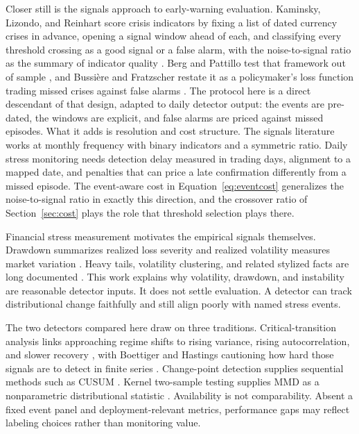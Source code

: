 \documentclass[pdflatex,sn-mathphys-num,iicol]{sn-jnl}
\begin{document}
Closer still is the signals approach to early-warning evaluation. Kaminsky, Lizondo, and Reinhart score crisis indicators by fixing a list of dated currency crises in advance, opening a signal window ahead of each, and classifying every threshold crossing as a good signal or a false alarm, with the noise-to-signal ratio as the summary of indicator quality \cite{kaminsky1998}. Berg and Pattillo test that framework out of sample \cite{berg1999}, and Bussi{\`e}re and Fratzscher restate it as a policymaker's loss function trading missed crises against false alarms \cite{bussiere2006}. The protocol here is a direct descendant of that design, adapted to daily detector output: the events are pre-dated, the windows are explicit, and false alarms are priced against missed episodes. What it adds is resolution and cost structure. The signals literature works at monthly frequency with binary indicators and a symmetric ratio. Daily stress monitoring needs detection delay measured in trading days, alignment to a mapped date, and penalties that can price a late confirmation differently from a missed episode. The event-aware cost in Equation~\eqref{eq:eventcost} generalizes the noise-to-signal ratio in exactly this direction, and the crossover ratio of Section~\ref{sec:cost} plays the role that threshold selection plays there.

Financial stress measurement motivates the empirical signals themselves. Drawdown summarizes realized loss severity \cite{magdon2004} and realized volatility measures market variation \cite{andersen2003}. Heavy tails, volatility clustering, and related stylized facts are long documented \cite{mandelbrot1963,cont2001,engle1982,bollerslev1986}. This work explains why volatility, drawdown, and instability are reasonable detector inputs. It does not settle evaluation. A detector can track distributional change faithfully and still align poorly with named stress events.

The two detectors compared here draw on three traditions. Critical-transition analysis links approaching regime shifts to rising variance, rising autocorrelation, and slower recovery \cite{scheffer2009,dakos2012}, with Boettiger and Hastings cautioning how hard those signals are to detect in finite series \cite{boettiger2012}. Change-point detection supplies sequential methods such as CUSUM \cite{page1954}. Kernel two-sample testing supplies MMD as a nonparametric distributional statistic \cite{gretton2012}. Availability is not comparability. Absent a fixed event panel and deployment-relevant metrics, performance gaps may reflect labeling choices rather than monitoring value.
\end{document}
